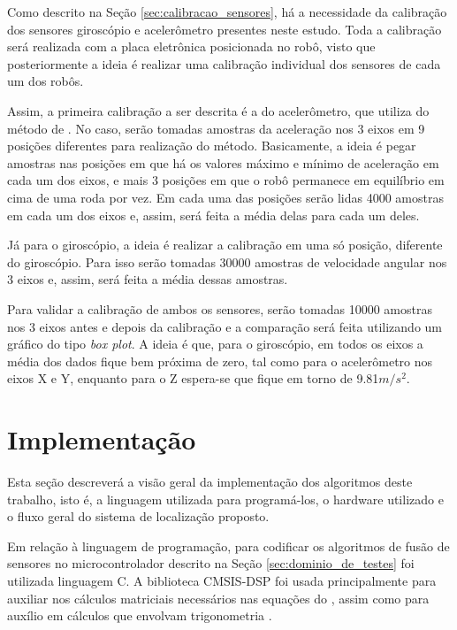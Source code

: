 \documentclass[acronym, symbols, table]{fei}
\begin{document}
		Como descrito na Seção \ref{sec:calibracao_sensores}, há a necessidade da calibração dos sensores giroscópio e acelerômetro presentes neste estudo. Toda a calibração será realizada com a placa eletrônica posicionada no robô, visto que posteriormente a ideia é realizar uma calibração individual dos sensores de cada um dos robôs.
		
		Assim, a primeira calibração a ser descrita é a do acelerômetro, que utiliza do método de \textcite{menezes2020triaxial}. No caso, serão tomadas amostras da aceleração nos 3 eixos em 9 posições diferentes para realização do método. Basicamente, a ideia é pegar amostras nas posições em que há os valores máximo e mínimo de aceleração em cada um dos eixos, e mais 3 posições em que o robô permanece em equilíbrio em cima de uma roda por vez. Em cada uma das posições serão lidas 4000 amostras em cada um dos eixos e, assim, será feita a média delas para cada um deles.
		
		Já para o giroscópio, a ideia é realizar a calibração em uma só posição, diferente do giroscópio. Para isso serão tomadas 30000 amostras de velocidade angular nos 3 eixos e, assim, será feita a média dessas amostras.
		
		Para validar a calibração de ambos os sensores, serão tomadas 10000 amostras nos 3 eixos antes e depois da calibração e a comparação será feita utilizando um gráfico do tipo \textit{box plot}. A ideia é que, para o giroscópio, em todos os eixos a média dos dados fique bem próxima de zero, tal como para o acelerômetro nos eixos X e Y, enquanto para o Z espera-se que fique em torno de 9.81$m/s^{2}$.
		
	\section{Implementação}
	
		Esta seção descreverá a visão geral da implementação dos algoritmos deste trabalho, isto é, a linguagem utilizada para programá-los, o hardware utilizado e o fluxo geral do sistema de localização proposto.
		
		Em relação à linguagem de programação, para codificar os algoritmos de fusão de sensores no microcontrolador descrito na Seção \ref{sec:dominio_de_testes} foi utilizada linguagem C. A biblioteca CMSIS-DSP foi usada principalmente para auxiliar nos cálculos matriciais necessários nas equações do , assim como para auxílio em cálculos que envolvam trigonometria \cite{cmsis_dsp}.
		
\end{document}
